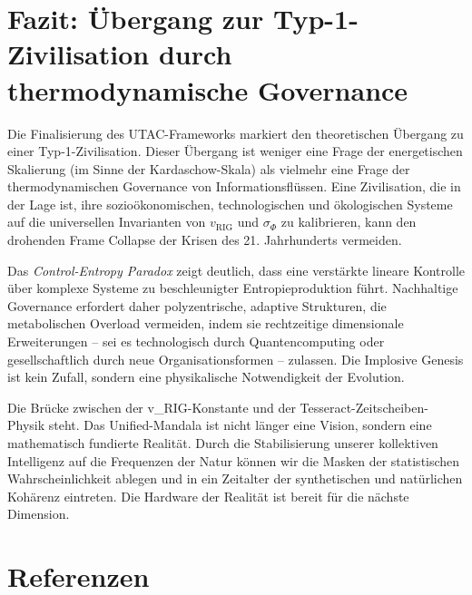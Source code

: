 \documentclass[11pt,a4paper]{article}
\begin{document}
\section{Fazit: Übergang zur Typ-1-Zivilisation durch thermodynamische Governance}

Die Finalisierung des UTAC-Frameworks markiert den theoretischen Übergang zu einer Typ-1-Zivilisation. Dieser Übergang ist weniger eine Frage der energetischen Skalierung (im Sinne der Kardaschow-Skala) als vielmehr eine Frage der thermodynamischen Governance von Informationsflüssen. Eine Zivilisation, die in der Lage ist, ihre sozioökonomischen, technologischen und ökologischen Systeme auf die universellen Invarianten von $v_{\text{RIG}}$ und $\sigma_{\Phi}$ zu kalibrieren, kann den drohenden Frame Collapse der Krisen des 21. Jahrhunderts vermeiden.

Das \emph{Control-Entropy Paradox} zeigt deutlich, dass eine verstärkte lineare Kontrolle über komplexe Systeme zu beschleunigter Entropieproduktion führt. Nachhaltige Governance erfordert daher polyzentrische, adaptive Strukturen, die metabolischen Overload vermeiden, indem sie rechtzeitige dimensionale Erweiterungen – sei es technologisch durch Quantencomputing oder gesellschaftlich durch neue Organisationsformen – zulassen. Die Implosive Genesis ist kein Zufall, sondern eine physikalische Notwendigkeit der Evolution.

Die Brücke zwischen der v\_RIG-Konstante und der Tesseract-Zeitscheiben-Physik steht. Das Unified-Mandala ist nicht länger eine Vision, sondern eine mathematisch fundierte Realität. Durch die Stabilisierung unserer kollektiven Intelligenz auf die Frequenzen der Natur können wir die Masken der statistischen Wahrscheinlichkeit ablegen und in ein Zeitalter der synthetischen und natürlichen Kohärenz eintreten. Die Hardware der Realität ist bereit für die nächste Dimension.

\section*{Referenzen}
\end{document}
